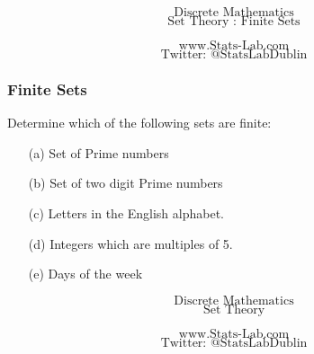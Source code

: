 \documentclass{beamer}
\begin{document}
	\begin{frame}
		\Huge
		\[\mbox{Discrete Mathematics}\]
		\Huge
		\[\mbox{Set Theory : Finite Sets}\]
		
		\Large
		\[\mbox{www.Stats-Lab.com}\]
		\Large
		\[\mbox{Twitter: @StatsLabDublin}\]
		
	\end{frame}
	\begin{frame}
		\frametitle{Finite Sets}
		\Large
		\vspace{-1.2cm}
		Determine which of the following sets are finite:
		\begin{itemize}
			\item[(a)] Set of Prime numbers %
			\vspace{0.4cm}
			\item[(b)] Set of two digit Prime numbers %
			\vspace{0.4cm}
			\item[(c)] Letters in the English alphabet.
			\vspace{0.4cm}
			\item[(d)] Integers which are multiples of 5.
			\vspace{0.4cm}
			\item[(e)] Days of the week %
		\end{itemize}
	\end{frame}
	
	
	
	
	
	\begin{frame}
		\Huge
		\[\mbox{Discrete Mathematics}\]
		\Huge
		\[\mbox{Set Theory}\]
		
		\Large
		\[\mbox{www.Stats-Lab.com}\]
		\Large
		\[\mbox{Twitter: @StatsLabDublin}\]
		
	\end{frame}
	
\end{document}
